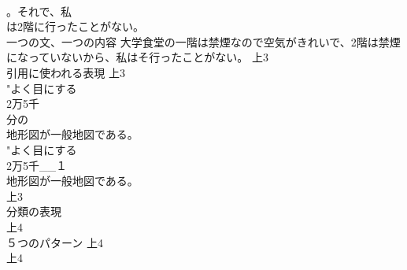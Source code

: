 \documentclass[8pt]{extreport}
\begin{document}
\begin{CJK}{UTF8}{min}
\\	。それで、私
\\	は2階に行ったことがない。
\\	一つの文、一つの内容	大学食堂の一階は禁煙なので空気がきれいで、2階は禁煙になっていないから、私はそ行ったことがない。			上3
\\	引用に使われる表現			上3
\\	"よく目にする
\\	2万5千
\\	分の
\\	地形図が一般地図である。
\\	"よく目にする
\\	2万5千__１
\\	地形図が一般地図である。
\\	上3
\\	分類の表現	
\\	上4
\\	５つのパターン			上4
\\	上4
\end{CJK}
\end{document}
